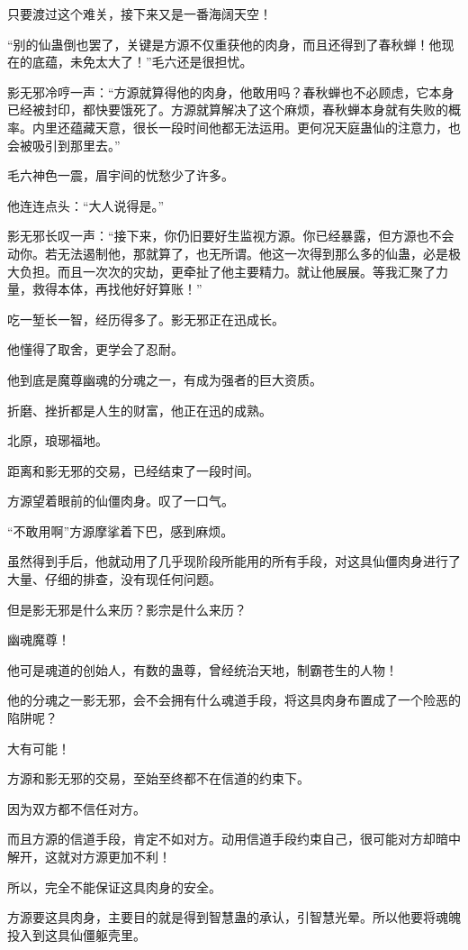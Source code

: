 \begin{this_body}
只要渡过这个难关，接下来又是一番海阔天空！

“别的仙蛊倒也罢了，关键是方源不仅重获他的肉身，而且还得到了春秋蝉！他现在的底蕴，未免太大了！”毛六还是很担忧。

影无邪冷哼一声：“方源就算得他的肉身，他敢用吗？春秋蝉也不必顾虑，它本身已经被封印，都快要饿死了。方源就算解决了这个麻烦，春秋蝉本身就有失败的概率。内里还蕴藏天意，很长一段时间他都无法运用。更何况天庭蛊仙的注意力，也会被吸引到那里去。”

毛六神色一震，眉宇间的忧愁少了许多。

他连连点头：“大人说得是。”

影无邪长叹一声：“接下来，你仍旧要好生监视方源。你已经暴露，但方源也不会动你。若无法遏制他，那就算了，也无所谓。他这一次得到那么多的仙蛊，必是极大负担。而且一次次的灾劫，更牵扯了他主要精力。就让他展展。等我汇聚了力量，救得本体，再找他好好算账！”

吃一堑长一智，经历得多了。影无邪正在迅成长。

他懂得了取舍，更学会了忍耐。

他到底是魔尊幽魂的分魂之一，有成为强者的巨大资质。

折磨、挫折都是人生的财富，他正在迅的成熟。

北原，琅琊福地。

距离和影无邪的交易，已经结束了一段时间。

方源望着眼前的仙僵肉身。叹了一口气。

“不敢用啊”方源摩挲着下巴，感到麻烦。

虽然得到手后，他就动用了几乎现阶段所能用的所有手段，对这具仙僵肉身进行了大量、仔细的排查，没有现任何问题。

但是影无邪是什么来历？影宗是什么来历？

幽魂魔尊！

他可是魂道的创始人，有数的蛊尊，曾经统治天地，制霸苍生的人物！

他的分魂之一影无邪，会不会拥有什么魂道手段，将这具肉身布置成了一个险恶的陷阱呢？

大有可能！

方源和影无邪的交易，至始至终都不在信道的约束下。

因为双方都不信任对方。

而且方源的信道手段，肯定不如对方。动用信道手段约束自己，很可能对方却暗中解开，这就对方源更加不利！

所以，完全不能保证这具肉身的安全。

方源要这具肉身，主要目的就是得到智慧蛊的承认，引智慧光晕。所以他要将魂魄投入到这具仙僵躯壳里。


\end{this_body}
